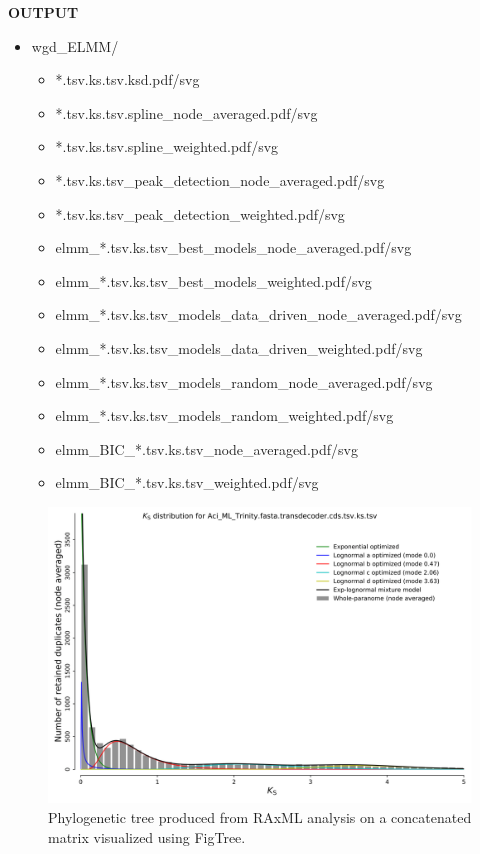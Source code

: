 \documentclass[
  12pt,
]{article}
\providecommand{\tightlist}{%
  \setlength{\itemsep}{0pt}\setlength{\parskip}{0pt}}
\begin{document}
\textbf{OUTPUT}

\begin{itemize}
\tightlist
\item
  wgd\_ELMM/

  \begin{itemize}
  \tightlist
  \item
    *.tsv.ks.tsv.ksd.pdf/svg
  \item
    *.tsv.ks.tsv.spline\_node\_averaged.pdf/svg
  \item
    *.tsv.ks.tsv.spline\_weighted.pdf/svg
  \item
    *.tsv.ks.tsv\_peak\_detection\_node\_averaged.pdf/svg
  \item
    *.tsv.ks.tsv\_peak\_detection\_weighted.pdf/svg
  \item
    elmm\_*.tsv.ks.tsv\_best\_models\_node\_averaged.pdf/svg
  \item
    elmm\_*.tsv.ks.tsv\_best\_models\_weighted.pdf/svg
  \item
    elmm\_*.tsv.ks.tsv\_models\_data\_driven\_node\_averaged.pdf/svg
  \item
    elmm\_*.tsv.ks.tsv\_models\_data\_driven\_weighted.pdf/svg
  \item
    elmm\_*.tsv.ks.tsv\_models\_random\_node\_averaged.pdf/svg
  \item
    elmm\_*.tsv.ks.tsv\_models\_random\_weighted.pdf/svg
  \item
    elmm\_BIC\_*.tsv.ks.tsv\_node\_averaged.pdf/svg
  \item
    elmm\_BIC\_*.tsv.ks.tsv\_weighted.pdf/svg
  \end{itemize}
\end{itemize}

\begin{figure}
\includegraphics[width=1\linewidth]{Images/aci_ksplot} \caption{Phylogenetic tree produced from RAxML analysis on a concatenated matrix visualized using FigTree.}\label{fig:ksplot}
\end{figure}
\end{document}

